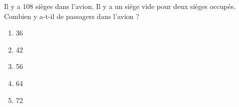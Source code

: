 Il y a 108 sièges dans l'avion. Il y a un siège vide pour deux sièges occupés. Combien y a-t-il de passagers dans l'avion ?
\begin{multicols}{5}
\begin{enumerate}[A/]
\item 36
\item 42
\item 56
\item 64
\item 72
\end{enumerate}  
\end{multicols}
